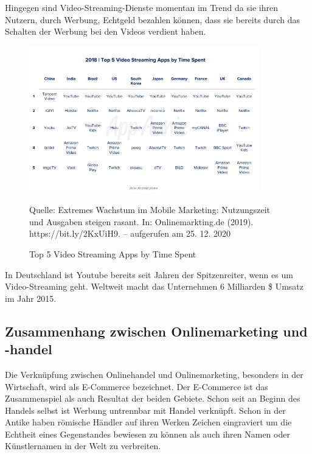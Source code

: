 \documentclass[a4paper, 12pt]{scrartcl}
\newcommand*{\bildquelle}{%
  \footnotesize Quelle:
}
\begin{document}
Hingegen sind Video-Streaming-Dienste momentan im Trend da sie ihren Nutzern, durch Werbung, Echtgeld bezahlen können, dass sie bereits durch das Schalten der Werbung bei den Videos verdient haben.

\begin{figure}[h]
    \begin{center} 
        \includegraphics[width=10cm]{media/4.png}
        \caption{Top 5 Video Streaming Apps by Time Spent}
        \label{stream}
        \bildquelle Extremes Wachstum im Mobile Marketing: Nutzungszeit und Ausgaben steigen rasant. In: Onlinemarkting.de (2019). https://bit.ly/2KxUiH9. – aufgerufen am 25. 12. 2020
    \end{center}
\end{figure}
  
\noindent In Deutschland ist Youtube bereits seit Jahren der Spitzenreiter, wenn es um Video-Streaming geht. Weltweit macht das Unternehmen 6 Milliarden \$ Umsatz im Jahr 2015.




        \subsection{Zusammenhang zwischen Onlinemarketing und -handel}
            
            
            
            Die Verknüpfung zwischen Onlinehandel und Onlinemarketing, besonders in der Wirtschaft, wird als E-Commerce bezeichnet. Der E-Commerce ist das Zusammenspiel als auch Resultat der beiden Gebiete. Schon seit an Beginn des Handels selbst ist Werbung untrennbar mit Handel verknüpft. Schon in der Antike haben römische Händler auf ihren Werken Zeichen eingraviert um die Echtheit eines Gegenstandes bewiesen zu können als auch ihren Namen oder Künstlernamen in der Welt zu verbreiten.
\end{document}
